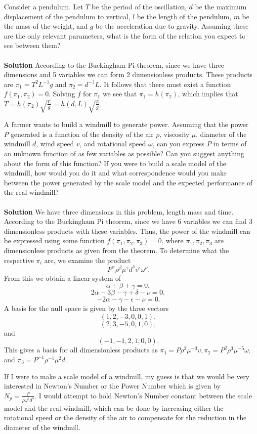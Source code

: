 \documentclass[12pt]{article}
\newenvironment{exercise}[2][Exercise]{\begin{trivlist}
\item[\hskip \labelsep {\bfseries #1}\hskip \labelsep {\bfseries #2.}]}{\end{trivlist}}
\begin{document}
\begin{exercise}{2}
Consider a pendulum. Let $T$ be the period of the oscillation, $d$ be the maximum displacement of the pendulum to vertical, $l$ be the length of the pendulum, $m$ be the mass of the weight, and $g$ be the acceleration due to gravity. Assuming these are the only relevant parameters, what is the form of the relation you expect to see between them?
\\
\\
\textbf{Solution}
According to the Buckingham Pi theorem, since we have three dimensions and 5 variables we can form 2 dimensionless products. These products are $\pi_1 = T^2L^{-1}g$ and $\pi_2 = d^{-1}L$. It follows that there must exist a function $f(\pi_1, \pi_2) = 0.$ Solving $f$ for $\pi_1$ we see that $\pi_1 = h(\pi_2)$, which implies that $T = h(\pi_2) \sqrt{\frac{L}{g}} = h(d, L) \sqrt{\frac{L}{g}}$.
\end{exercise}

\begin{exercise}{3}
A farmer wants to build a windmill to generate power. Assuming that the power $P$
generated is a function of the density of the air $\rho$, viscosity $\mu$, diameter of the windmill $d$, wind speed $v$, and rotational speed $\omega$, can you express $P$ in terms of an unknown function of as few variables as possible? Can you suggest anything about the form of this function? If you were to build a scale model of the windmill, how would you do it and what correspondence would you make between the power generated by the scale model and the expected performance of the real windmill?
\\
\\
\textbf{Solution}
We have three dimensions in this problem, length mass and time. According to the Buckingham Pi theorem, since we have 6 variables we can find 3 dimensionless products with these variables. Thus, the power of the windmill can be expressed using some function $f(\pi_1, \pi_2, \pi_3) = 0$, where $\pi_1, \pi_2, \pi_3$ are dimensionless products as given from the theorem. To determine what the respective $\pi_i$ are, we examine the product 
$$P^\alpha \rho^\beta \mu^\gamma d^\delta v^\epsilon \omega^\nu.$$
From this we obtain a linear system of $$\alpha + \beta + \gamma = 0,$$ $$2 \alpha - 3\beta - \gamma + \delta - \nu = 0,$$ $$-2 \alpha - \gamma -  \epsilon - \nu = 0.$$ A basis for the null space is given by the three vectors $$(1, 2, -3, 0, 0, 1),$$ $$(2, 3, -5, 0, 1, 0),$$ and $$(-1, -1, 2, 1, 0, 0).$$ This gives a basis for all dimensionless products as $\pi_1 = P \rho^2 \mu^{-3} v, \pi_2 = P^2 \rho^3 \mu^{-5} \omega,$ and $\pi_3 = P^{-1} \rho^{-1} \mu^2d$.

If I were to make a scale model of a windmill, my guess is that we would be very interested in Newton's Number or the Power Number which is given by $N_p = \frac{P}{\rho \omega^3 d^5}$. I would attempt to hold Newton's Number constant between the scale model and the real windmill, which can be done by increasing either the rotational speed or the density of the air to compensate for the reduction in the diameter of the windmill.
\end{exercise}
\end{document}
